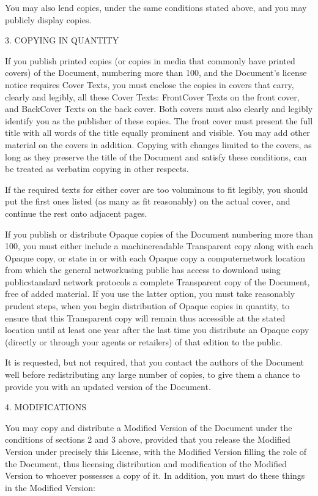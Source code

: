 \documentclass[a4paper,11pt]{report}
\begin{document}
{ You may also lend copies, under the same conditions stated above, and you may
publicly display copies. 

 3. COPYING IN QUANTITY 

 If you publish printed copies (or copies in media that commonly have printed
covers) of the Document, numbering more than 100, and the Document's license
notice requires Cover Texts, you must enclose the copies in covers that carry,
clearly and legibly, all these Cover Texts: Front\texttt{}Cover
Texts on the front cover, and Back\texttt{}Cover Texts on the back
cover. Both covers must also clearly and legibly identify you as the publisher
of these copies. The front cover must present the full title with all words of
the title equally prominent and visible. You may add other material on the
covers in addition. Copying with changes limited to the covers, as long as
they preserve the title of the Document and satisfy these conditions, can be
treated as verbatim copying in other respects. 

 If the required texts for either cover are too voluminous to fit legibly, you
should put the first ones listed (as many as fit reasonably) on the actual
cover, and continue the rest onto adjacent pages. 

 If you publish or distribute Opaque copies of the Document numbering more than
100, you must either include a machine\texttt{}readable Transparent
copy along with each Opaque copy, or state in or with each Opaque copy a
computer\texttt{}network location from which the general
network\texttt{}using public has access to download using
public\texttt{}standard network protocols a complete Transparent
copy of the Document, free of added material. If you use the latter option,
you must take reasonably prudent steps, when you begin distribution of Opaque
copies in quantity, to ensure that this Transparent copy will remain thus
accessible at the stated location until at least one year after the last time
you distribute an Opaque copy (directly or through your agents or retailers)
of that edition to the public. 

 It is requested, but not required, that you contact the authors of the
Document well before redistributing any large number of copies, to give them a
chance to provide you with an updated version of the Document. 

 4. MODIFICATIONS 

 You may copy and distribute a Modified Version of the Document under the
conditions of sections 2 and 3 above, provided that you release the Modified
Version under precisely this License, with the Modified Version filling the
role of the Document, thus licensing distribution and modification of the
Modified Version to whoever possesses a copy of it. In addition, you must do
these things in the Modified Version: 

}
\end{document}
